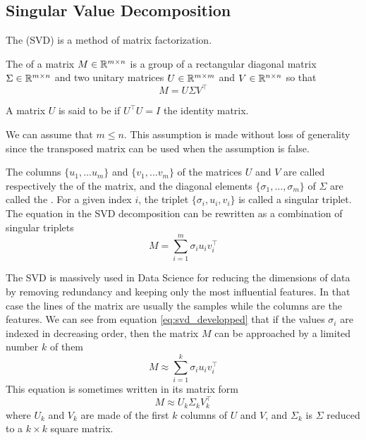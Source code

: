 \subsection{Singular Value Decomposition}
The  (SVD) is a method of matrix factorization.
\begin{definition}
    The  of a matrix $M \in \mathbb{R}^{m\times n}$ is a group of a rectangular diagonal matrix $\Sigma \in \mathbb{R}^{m \times n}$ and two unitary matrices $U \in \mathbb{R}^{m\times m}$ and $V \in \mathbb{R}^{n\times n}$ so that
    \begin{equation}
        M = U\Sigma V^\top
    \end{equation}
\end{definition}
A matrix $U$ is said to be  if $U^\top U = I$ the identity matrix.

We can assume that $m \leq n$. This assumption is made without loss of generality since the transposed matrix can be used when the assumption is false.

The columns $\{u_1,\dots u_m\}$ and $\{v_1, \dots v_m\}$ of the matrices $U$ and $V$ are called respectively the  of the matrix, and the diagonal elements $\{\sigma_1, \dots, \sigma_m\}$ of $\Sigma$ are called the . For a given index $i$, the triplet $\{\sigma_i, u_i, v_i\}$ is called a singular triplet. The equation in the SVD decomposition can be rewritten as a combination of singular triplets
\begin{equation}\label{eq:svd_developped}
    M = \sum_{i=1}^m \sigma_i u_i v_i^\top
\end{equation}

The SVD is massively used in Data Science for reducing the dimensions of data by removing redundancy and keeping only the most influential features. In that case the lines of the matrix are usually the samples while the columns are the features. We can see from equation \ref{eq:svd_developped} that if the values $\sigma_i$ are indexed in decreasing order, then the matrix $M$ can be approached by a limited number $k$ of them
\begin{equation}\label{eq:svd_trunc_developped}
    M \approx \sum_{i=1}^k \sigma_i u_i v_i^\top
\end{equation}
This equation is sometimes written in its matrix form
\begin{equation}
    M \approx U_k\Sigma_k V_k^\top
\end{equation}
where $U_k$ and $V_k$ are made of the first $k$ columns of $U$ and $V$, and $\Sigma_k$ is $\Sigma$ reduced to a $k\times k$ square matrix.

